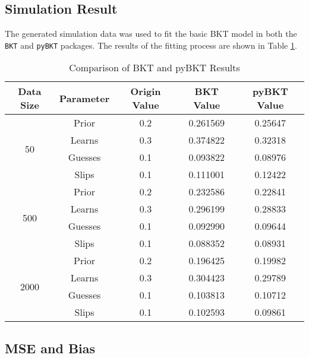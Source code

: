 \documentclass{article}
\begin{document}
\subsection{Simulation Result}



The generated simulation data was used to fit the basic BKT model in both the \texttt{BKT} and \texttt{pyBKT} packages. The results of the fitting process are shown in Table \ref{tab:bkt-comparison}.

\begin{table}[H]
\centering
\caption{Comparison of BKT and pyBKT Results}
\label{tab:bkt-comparison}
\begin{tabular}{|c|c|c|c|c|}
\hline
\textbf{Data Size} & \textbf{Parameter} & \textbf{Origin Value} & \textbf{BKT Value} & \textbf{pyBKT Value} \\ \hline
\multirow{4}{*}{50} & Prior   & 0.2      & 0.261569 & 0.25647 \\ \cline{2-5}
                    & Learns  & 0.3      & 0.374822 & 0.32318 \\ \cline{2-5}
                    & Guesses & 0.1      & 0.093822 & 0.08976 \\ \cline{2-5}
                    & Slips   & 0.1      & 0.111001 & 0.12422 \\ \hline
\multirow{4}{*}{500} & Prior   & 0.2      & 0.232586 & 0.22841 \\ \cline{2-5}
                     & Learns  & 0.3      & 0.296199 & 0.28833 \\ \cline{2-5}
                     & Guesses & 0.1      & 0.092990 & 0.09644 \\ \cline{2-5}
                     & Slips   & 0.1      & 0.088352 & 0.08931 \\ \hline
\multirow{4}{*}{2000} & Prior   & 0.2      & 0.196425 & 0.19982 \\ \cline{2-5}
                      & Learns  & 0.3      & 0.304423 & 0.29789 \\ \cline{2-5}
                      & Guesses & 0.1      & 0.103813 & 0.10712 \\ \cline{2-5}
                      & Slips   & 0.1      & 0.102593 & 0.09861 \\ \hline
\end{tabular}
\end{table}

\subsection{MSE and Bias}
\end{document}
